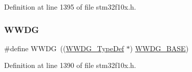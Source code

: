 Definition at line 1395 of file stm32f10x.\+h.

\mbox{\label{group___peripheral__declaration_ga9821fd01757986612ddb8982e2fe27f1}} 
\subsubsection{\texorpdfstring{W\+W\+DG}{WWDG}}
{\footnotesize\ttfamily \#define W\+W\+DG~((\hyperlink{struct_w_w_d_g___type_def}{W\+W\+D\+G\+\_\+\+Type\+Def} $\ast$) \hyperlink{group___peripheral__memory__map_ga9a5bf4728ab93dea5b569f5b972cbe62}{W\+W\+D\+G\+\_\+\+B\+A\+SE})}



Definition at line 1390 of file stm32f10x.\+h.

